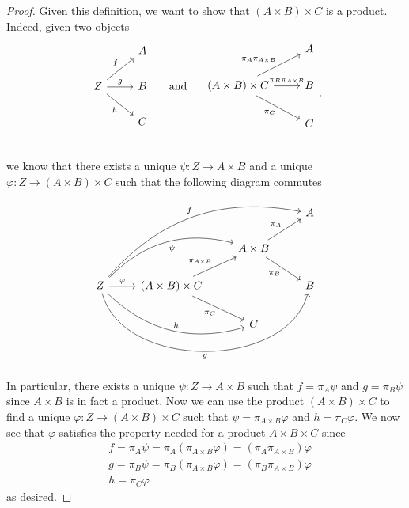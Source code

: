 \documentclass{article}
\theoremstyle{definition}
\begin{document}
\begin{proof}
	Given this definition, we want to show that $(A \times B) \times C$ is a product.
	Indeed, given two objects \begin{equation*}
		\begin{tikzcd}
			& A \\
			Z \arrow[ur, "f"] \arrow[r, "g"] \arrow[dr, "h"'] & B & \hspace{-1.25em}\textrm{and}\hspace{1em} \\
			& C \\
		\end{tikzcd} \begin{tikzcd}
			& A \\
			(A \times B) \times C \arrow[ur, "\pi_A\pi_{A \times B}"] \arrow[r, "\pi_B\pi_{A \times B}"] \arrow[dr, "\pi_C"'] & B \\
			& C \\
		\end{tikzcd},
	\end{equation*}
	we know that there exists a unique $\psi : Z \to A \times B$ and a unique $\varphi : Z \to (A \times B) \times C$ such that the following diagram commutes \begin{equation*}
		\begin{tikzcd}
			& & & A \\
			& & A \times B \arrow[ur, "\pi_A"] \arrow[dr, "\pi_B"'] \\
			Z \arrow[uurrr, bend left, "f"] \arrow[urr, bend left, "\psi"'] \arrow[r, "\varphi"] \arrow[drr, bend right, "h"] \arrow[rrr, bend right = 75, "g"'] & (A \times B) \times C \arrow[ur, "\pi_{A \times B}"] \arrow[dr, "\pi_C"'] & & B \\
			& & C
		\end{tikzcd}
	\end{equation*}
	In particular, there exists a unique $\psi : Z \to A \times B$ such that $f = \pi_A \psi$ and $g = \pi_B \psi$ since $A \times B$ is in fact a product.
	Now we can use the product $(A \times B) \times C$ to find a unique $\varphi : Z \to (A \times B) \times C$ such that $\psi = \pi_{A \times B} \varphi$ and $h = \pi_C \varphi$.
	We now see that $\varphi$ satisfies the property needed for a product $A \times B \times C$ since \begin{align*}
		 & f = \pi_A \psi = \pi_A (\pi_{A \times B} \varphi) = (\pi_A \pi_{A \times B}) \varphi \\
		 & g = \pi_B \psi = \pi_B (\pi_{A \times B} \varphi) = (\pi_B \pi_{A \times B}) \varphi \\
		 & h = \pi_C \varphi
	\end{align*}
	as desired.


\end{proof}
\end{document}
